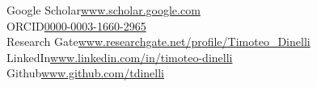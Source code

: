 Google Scholar\hfill\href{https://scholar.google.com/citations?user=H117wUwAAAAJ&hl=it&oi=ao}{www.scholar.google.com}\\
ORCID\hfill\href{https://orcid.org/0000-0003-1660-2965}{0000-0003-1660-2965}\\
Research Gate\hfill\href{https://www.researchgate.net/profile/Timoteo_Dinelli}{www.researchgate.net/profile/Timoteo\_Dinelli}\\
LinkedIn\hfill\href{https://www.linkedin.com/in/timoteo-dinelli/}{www.linkedin.com/in/timoteo-dinelli}\\
Github\hfill\href{https://github.com/tdinelli}{www.github.com/tdinelli}
